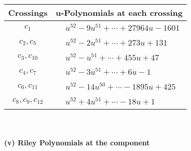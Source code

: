 \documentclass[1p]{elsarticle_modified}
\theoremstyle{definition}
\begin{document}
\begin{tabular}{m{50pt}|m{274pt}}
Crossings & \hspace{64pt}u-Polynomials at each crossing \\
\hline $$\begin{aligned}c_{1}\end{aligned}$$&$\begin{aligned}
&u^{52}-9 u^{51}+\cdots+27964 u-1601
\end{aligned}$\\
\hline $$\begin{aligned}c_{2},c_{5}\end{aligned}$$&$\begin{aligned}
&u^{52}-2 u^{51}+\cdots+273 u+131
\end{aligned}$\\
\hline $$\begin{aligned}c_{3},c_{10}\end{aligned}$$&$\begin{aligned}
&u^{52}- u^{51}+\cdots+455 u+47
\end{aligned}$\\
\hline $$\begin{aligned}c_{4},c_{7}\end{aligned}$$&$\begin{aligned}
&u^{52}-3 u^{51}+\cdots+6 u-1
\end{aligned}$\\
\hline $$\begin{aligned}c_{6},c_{11}\end{aligned}$$&$\begin{aligned}
&u^{52}-14 u^{50}+\cdots-1895 u+425
\end{aligned}$\\
\hline $$\begin{aligned}c_{8},c_{9},c_{12}\end{aligned}$$&$\begin{aligned}
&u^{52}+4 u^{51}+\cdots-18 u+1
\end{aligned}$\\
\hline
\end{tabular}\\~\\
\newpage\renewcommand{\arraystretch}{1}
\flushleft \textbf{(v) Riley Polynomials at the component}\newline \\
\end{document}

